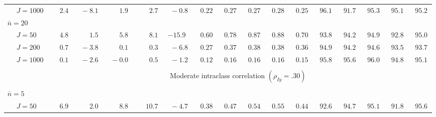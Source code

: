 \begin{sidewaystable}
\begin{threeparttable}
\begin{tabular}{llccccccccccccccc}
 & \nopagebreak $\;J=1000$  & $\phantom{0}\phantom{-}2.4\phantom{0}$ & $\phantom{0}{-}8.1\phantom{0}$ & $\phantom{0}\phantom{-}1.9\phantom{0}$ & $\phantom{0}\phantom{-}2.7\phantom{0}$ & $\phantom{0}{-}0.8\phantom{0}$ & $\phantom{0}0.22\phantom{0}$ & $\phantom{0}0.27\phantom{0}$ & $\phantom{0}0.27\phantom{0}$ & $\phantom{0}0.28\phantom{0}$ & $\phantom{0}0.25\phantom{0}$ & $\phantom{0}96.1\phantom{0}$ & $\phantom{0}91.7\phantom{0}$ & $\phantom{0}95.3\phantom{0}$ & $\phantom{0}95.1\phantom{0}$ & $\phantom{0}95.2\phantom{0}$ \\
\multicolumn{4}{l}{$\bar{n}=20$} \\  & \nopagebreak $\;J=50$  & $\phantom{0}\phantom{-}4.8\phantom{0}$ & $\phantom{0}\phantom{-}1.5\phantom{0}$ & $\phantom{0}\phantom{-}5.8\phantom{0}$ & $\phantom{0}\phantom{-}8.1\phantom{0}$ & ${-}15.9\phantom{0}$ & $\phantom{0}0.60\phantom{0}$ & $\phantom{0}0.78\phantom{0}$ & $\phantom{0}0.87\phantom{0}$ & $\phantom{0}0.88\phantom{0}$ & $\phantom{0}0.70\phantom{0}$ & $\phantom{0}93.8\phantom{0}$ & $\phantom{0}94.2\phantom{0}$ & $\phantom{0}94.9\phantom{0}$ & $\phantom{0}92.8\phantom{0}$ & $\phantom{0}95.0\phantom{0}$ \\
 & \nopagebreak $\;J=200$  & $\phantom{0}\phantom{-}0.7\phantom{0}$ & $\phantom{0}{-}3.8\phantom{0}$ & $\phantom{0}\phantom{-}0.1\phantom{0}$ & $\phantom{0}\phantom{-}0.3\phantom{0}$ & $\phantom{0}{-}6.8\phantom{0}$ & $\phantom{0}0.27\phantom{0}$ & $\phantom{0}0.37\phantom{0}$ & $\phantom{0}0.38\phantom{0}$ & $\phantom{0}0.38\phantom{0}$ & $\phantom{0}0.36\phantom{0}$ & $\phantom{0}94.9\phantom{0}$ & $\phantom{0}94.2\phantom{0}$ & $\phantom{0}94.6\phantom{0}$ & $\phantom{0}93.5\phantom{0}$ & $\phantom{0}93.7\phantom{0}$ \\
 & \nopagebreak $\;J=1000$  & $\phantom{0}\phantom{-}0.1\phantom{0}$ & $\phantom{0}{-}2.6\phantom{0}$ & $\phantom{0}{-}0.0\phantom{0}$ & $\phantom{0}\phantom{-}0.5\phantom{0}$ & $\phantom{0}{-}1.2\phantom{0}$ & $\phantom{0}0.12\phantom{0}$ & $\phantom{0}0.16\phantom{0}$ & $\phantom{0}0.16\phantom{0}$ & $\phantom{0}0.16\phantom{0}$ & $\phantom{0}0.15\phantom{0}$ & $\phantom{0}95.8\phantom{0}$ & $\phantom{0}95.6\phantom{0}$ & $\phantom{0}96.0\phantom{0}$ & $\phantom{0}94.8\phantom{0}$ & $\phantom{0}95.1\phantom{0}$ \\
[0.5ex]\hline\\[-1.6ex] 
& & \multicolumn{15}{c}{Moderate intraclass correlation $(\rho_{Iy}=.30)$} \\[0.6ex]\hline\\[-1.8ex]
\multicolumn{4}{l}{$\bar{n}=5$} \\  & \nopagebreak $\;J=50$  & $\phantom{0}\phantom{-}6.9\phantom{0}$ & $\phantom{0}\phantom{-}2.0\phantom{0}$ & $\phantom{0}\phantom{-}8.8\phantom{0}$ & $\phantom{-}10.7\phantom{0}$ & $\phantom{0}{-}4.7\phantom{0}$ & $\phantom{0}0.38\phantom{0}$ & $\phantom{0}0.47\phantom{0}$ & $\phantom{0}0.54\phantom{0}$ & $\phantom{0}0.55\phantom{0}$ & $\phantom{0}0.44\phantom{0}$ & $\phantom{0}92.6\phantom{0}$ & $\phantom{0}94.7\phantom{0}$ & $\phantom{0}95.1\phantom{0}$ & $\phantom{0}91.8\phantom{0}$ & $\phantom{0}95.6\phantom{0}$ \\

\end{tabular}
\end{threeparttable}
\end{sidewaystable}
